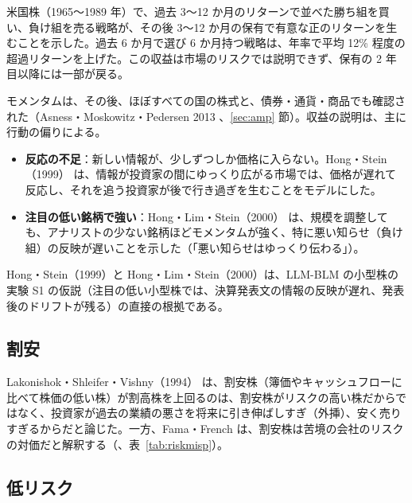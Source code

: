 \begin{paperbox}
米国株（1965〜1989 年）で、過去 3〜12 か月のリターンで並べた勝ち組を買い、負け組を売る戦略が、その後 3〜12 か月の保有で有意な正のリターンを生むことを示した。過去 6 か月で選び 6 か月持つ戦略は、年率で平均 12\% 程度の超過リターンを上げた。この収益は市場のリスクでは説明できず、保有の 2 年目以降には一部が戻る。
\end{paperbox}

モメンタムは、その後、ほぼすべての国の株式と、債券・通貨・商品でも確認された（Asness・Moskowitz・Pedersen 2013 \cite{amp2013}、\ref{sec:amp} 節）。収益の説明は、主に行動の偏りによる。

\begin{itemize}
\item \textbf{反応の不足}：新しい情報が、少しずつしか価格に入らない。Hong・Stein（1999）\cite{hongstein1999} は、情報が投資家の間にゆっくり広がる市場では、価格が遅れて反応し、それを追う投資家が後で行き過ぎを生むことをモデルにした。
\item \textbf{注目の低い銘柄で強い}：Hong・Lim・Stein（2000）\cite{hls2000} は、規模を調整しても、アナリストの少ない銘柄ほどモメンタムが強く、特に悪い知らせ（負け組）の反映が遅いことを示した（「悪い知らせはゆっくり伝わる」）。
\end{itemize}

\begin{projbox}
Hong・Stein（1999）と Hong・Lim・Stein（2000）は、LLM-BLM の小型株の実験 S1 の仮説（注目の低い小型株では、決算発表文の情報の反映が遅れ、発表後のドリフトが残る）の直接の根拠である。
\end{projbox}

\subsection{割安}

Lakonishok・Shleifer・Vishny（1994）\cite{lsv1994} は、割安株（簿価やキャッシュフローに比べて株価の低い株）が割高株を上回るのは、割安株がリスクの高い株だからではなく、投資家が過去の業績の悪さを将来に引き伸ばしすぎ（外挿）、安く売りすぎるからだと論じた。一方、Fama・French は、割安株は苦境の会社のリスクの対価だと解釈する（、表~\ref{tab:riskmisp}）。

\subsection{低リスク}

